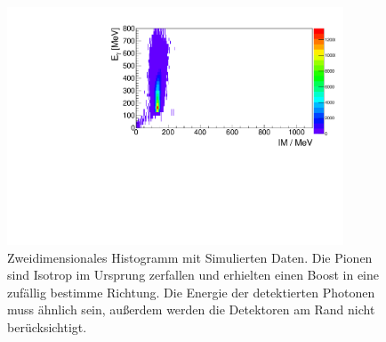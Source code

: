 \documentclass[a4paper,11pt,oneside,final,german,openbib,pdftex]{scrbook}
\begin{document}
{\begin{appendix}

\begin{figure}[h!]
	\begin{center}
		\includegraphics[width=100mm]{NewCalib/UrsprungIsotrop/20171904SimUrsprungIsotrop30DegreeCutHist}
		\caption[Simulation: 2D-Hist Isotroper Boost im Ursprung ohne Detektoren am Rand]{Zweidimensionales Histogramm mit Simulierten Daten. Die Pionen sind Isotrop im Ursprung zerfallen und erhielten einen Boost in eine zuf\"allig bestimme Richtung. Die Energie der detektierten Photonen muss \"ahnlich sein, au{\ss}erdem werden die Detektoren am Rand nicht ber\"ucksichtigt.}
		\label{fig:Sim-Data-Ursprung-2DHist-30-Degree-Edge}
	\end{center}
\end{figure}


\end{appendix}}
\end{document}

